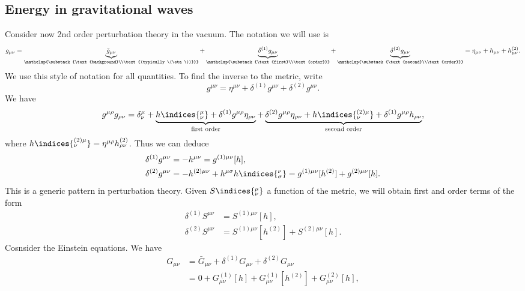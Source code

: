 \documentclass{jknotes}
\begin{document}
\subsection{Energy in gravitational waves}
Consider now 2nd order perturbation theory in the vacuum. The notation we will use is
\begin{equation}
    g_{\mu\nu} = \underbrace{\bar{g}_{\mu\nu}}_{\mathclap{\substack{\text{background}\\\text{(typically \(\eta\))}}}} + \underbrace{\delta^{(1)}g_{\mu\nu}}_{\mathclap{\substack{\text{first}\\\text{order}}}} + \underbrace{\delta^{(2)}g_{\mu\nu}}_{\mathclap{\substack{\text{second}\\\text{order}}}} = \eta_{\mu\nu} + h_{\mu\nu} + h^{(2)}_{\mu\nu}.
\end{equation}
We use this style of notation for all quantities.
To find the inverse to the metric, write
\begin{equation}
    g^{\mu\nu} = \eta^{\mu\nu} + \delta^{(1)}g^{\mu\nu} + \delta^{(2)}g^{\mu\nu}.
\end{equation}
We have
\begin{equation}
    g^{\mu\rho}g_{\rho\nu} = \delta^\mu_\nu + \underbrace{h\indices{^\mu_\nu} + \delta^{(1)}g^{\mu\rho}\eta_{\rho\nu}}_{\text{first order}} + \underbrace{\delta^{(2)}g^{\mu\rho}\eta_{\rho\nu} + h\indices{^{(2)\mu}_\nu} + \delta^{(1)}g^{\mu\rho}h_{\rho\nu}}_{\text{second order}},
\end{equation}
where \(h\indices{^{(2)\mu}_\nu} = \eta^{\mu\rho}h^{(2)}_{\rho\nu}\). Thus we can deduce
\begin{align}
    \delta^{(1)}g^{\mu\nu} &= -h^{\mu\nu} = g^{(1)\mu\nu}[h], \\
    \delta^{(2)}g^{\mu\nu} &= -h^{(2)\mu\nu} + h^{\mu\sigma}h\indices{_\sigma^\nu} = g^{(1)\mu\nu}[h^{(2)}] + g^{(2)\mu\nu}[h].
\end{align}
This is a generic pattern in perturbation theory. Given \(S\indices{^\mu_\nu}\) a function of the metric, we will obtain first and order terms of the form
\begin{align}
    \delta^{(1)}S^{\mu\nu} &= S^{(1)\mu\nu}[h], \\
    \delta^{(2)}S^{\mu\nu} &= S^{(1)\mu\nu}[h^{(2)}] + S^{(2)\mu\nu}[h].
\end{align}
Cosnsider the Einstein equations. We have
\begin{align}
    G_{\mu\nu} &= \bar{G}_{\mu\nu} + \delta^{(1)}G_{\mu\nu} + \delta^{(2)}G_{\mu\nu} \\
               &= 0 + G^{(1)}_{\mu\nu}[h] + G^{(1)}_{\mu\nu}[h^{(2)}] + G^{(2)}_{\mu\nu}[h],
\end{align}
\end{document}
